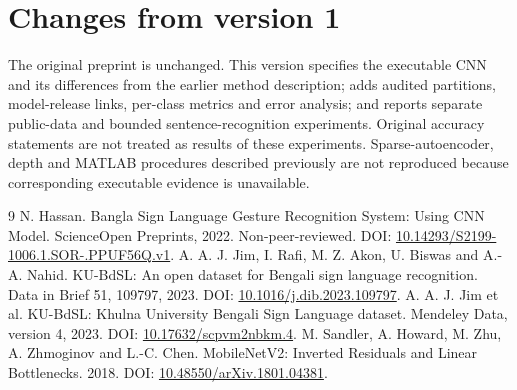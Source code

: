 \documentclass[11pt,a4paper]{article}
\begin{document}
\section{Changes from version 1}
The original preprint is unchanged. This version specifies the executable CNN and its differences from the earlier method description; adds audited partitions, model-release links, per-class metrics and error analysis; and reports separate public-data and bounded sentence-recognition experiments. Original accuracy statements are not treated as results of these experiments. Sparse-autoencoder, depth and MATLAB procedures described previously are not reproduced because corresponding executable evidence is unavailable.
\begin{thebibliography}{9}\small
{} N. Hassan. Bangla Sign Language Gesture Recognition System: Using CNN Model. ScienceOpen Preprints, 2022. Non-peer-reviewed. DOI: \href{https://doi.org/10.14293/S2199-1006.1.SOR-.PPUF56Q.v1}{10.14293/S2199-1006.1.SOR-.PPUF56Q.v1}.
 A. A. J. Jim, I. Rafi, M. Z. Akon, U. Biswas and A.-A. Nahid. KU-BdSL: An open dataset for Bengali sign language recognition. Data in Brief 51, 109797, 2023. DOI: \href{https://doi.org/10.1016/j.dib.2023.109797}{10.1016/j.dib.2023.109797}.
 A. A. J. Jim et al. KU-BdSL: Khulna University Bengali Sign Language dataset. Mendeley Data, version 4, 2023. DOI: \href{https://doi.org/10.17632/scpvm2nbkm.4}{10.17632/scpvm2nbkm.4}.
 M. Sandler, A. Howard, M. Zhu, A. Zhmoginov and L.-C. Chen. MobileNetV2: Inverted Residuals and Linear Bottlenecks. 2018. DOI: \href{https://doi.org/10.48550/arXiv.1801.04381}{10.48550/arXiv.1801.04381}.
\end{thebibliography}
\end{document}
